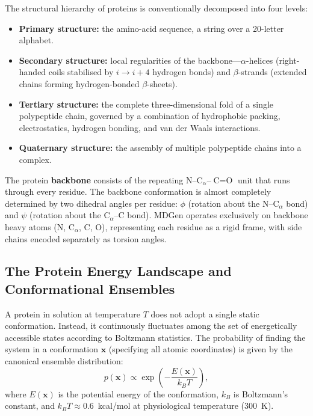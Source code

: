 \documentclass[11pt,a4paper]{article}
\newcommand{\bx}{\mathbf{x}}
\begin{document}
The structural hierarchy of proteins is conventionally decomposed into four levels:
\begin{itemize}[leftmargin=2em]
  \item \textbf{Primary structure:} the amino-acid sequence, a string over a 20-letter alphabet.
  \item \textbf{Secondary structure:} local regularities of the backbone---$\alpha$-helices
    (right-handed coils stabilised by $i \to i+4$ hydrogen bonds) and $\beta$-strands (extended
    chains forming hydrogen-bonded $\beta$-sheets).
  \item \textbf{Tertiary structure:} the complete three-dimensional fold of a single polypeptide
    chain, governed by a combination of hydrophobic packing, electrostatics, hydrogen bonding, and
    van der Waals interactions.
  \item \textbf{Quaternary structure:} the assembly of multiple polypeptide chains into a complex.
\end{itemize}

The protein \textbf{backbone} consists of the repeating $\text{N}$--$\text{C}_\alpha$--$\text{C}{=}\text{O}$
unit that runs through every residue.  The backbone conformation is almost completely determined by
two dihedral angles per residue: $\phi$ (rotation about the N--$\text{C}_\alpha$ bond) and $\psi$
(rotation about the $\text{C}_\alpha$--C bond).  MDGen operates exclusively on backbone heavy atoms
(N, $\text{C}_\alpha$, C, O), representing each residue as a rigid frame, with side chains encoded
separately as torsion angles.

\subsection{The Protein Energy Landscape and Conformational Ensembles}

A protein in solution at temperature $T$ does not adopt a single static conformation.  Instead, it
continuously fluctuates among the set of energetically accessible states according to Boltzmann
statistics.  The probability of finding the system in a conformation $\bx$ (specifying all atomic
coordinates) is given by the canonical ensemble distribution:
\begin{equation}
  p(\bx) \propto \exp\!\left(-\frac{E(\bx)}{k_B T}\right),
  \label{eq:boltzmann}
\end{equation}
where $E(\bx)$ is the potential energy of the conformation, $k_B$ is Boltzmann's constant, and
$k_B T \approx 0.6$~kcal/mol at physiological temperature (300~K).
\end{document}
